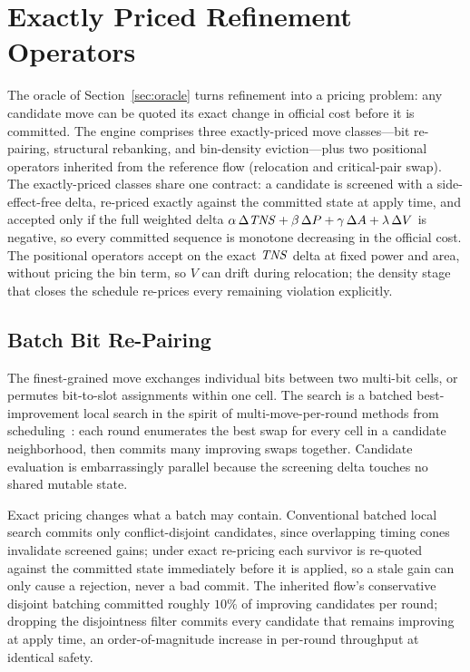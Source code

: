 \section{Exactly Priced Refinement Operators}\label{sec:operators}

The oracle of Section~\ref{sec:oracle} turns refinement into a pricing problem: any candidate move can be quoted its exact change in official cost before it is committed. The engine comprises three exactly-priced move classes---bit re-pairing, structural rebanking, and bin-density eviction---plus two positional operators inherited from the reference flow (relocation and critical-pair swap). The exactly-priced classes share one contract: a candidate is screened with a side-effect-free delta, re-priced exactly against the committed state at apply time, and accepted only if the full weighted delta $\alpha\,\Delta\mathit{TNS} + \beta\,\Delta P + \gamma\,\Delta A + \lambda\,\Delta V$ is negative, so every committed sequence is monotone decreasing in the official cost. The positional operators accept on the exact $\mathit{TNS}$ delta at fixed power and area, without pricing the bin term, so $V$ can drift during relocation; the density stage that closes the schedule re-prices every remaining violation explicitly.

\subsection{Batch Bit Re-Pairing}\label{sec:bitrepair}

The finest-grained move exchanges individual bits between two multi-bit cells, or permutes bit-to-slot assignments within one cell. The search is a batched best-improvement local search in the spirit of multi-move-per-round methods from scheduling~\cite{congram2002dynasearch}: each round enumerates the best swap for every cell in a candidate neighborhood, then commits many improving swaps together. Candidate evaluation is embarrassingly parallel because the screening delta touches no shared mutable state.

Exact pricing changes what a batch may contain. Conventional batched local search commits only conflict-disjoint candidates, since overlapping timing cones invalidate screened gains; under exact re-pricing each survivor is re-quoted against the committed state immediately before it is applied, so a stale gain can only cause a rejection, never a bad commit. The inherited flow's conservative disjoint batching committed roughly $10\%$ of improving candidates per round; dropping the disjointness filter commits every candidate that remains improving at apply time, an order-of-magnitude increase in per-round throughput at identical safety.

